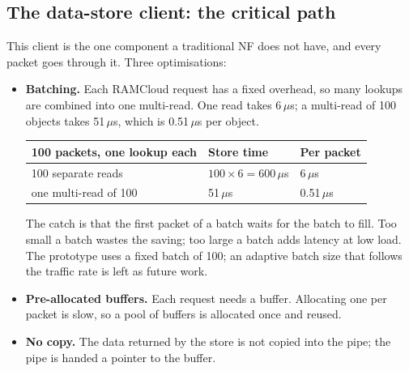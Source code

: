 \subsection{The data-store client: the critical path}\label{sec:slclient}
This client is the one component a traditional NF does not have, and every packet goes through it. Three optimisations:
\begin{itemize}
  \item \textbf{Batching.} Each RAMCloud request has a fixed overhead, so many lookups are combined into one multi-read. One read takes 6\,$\mu$s;
        a multi-read of 100 objects takes 51\,$\mu$s, which is 0.51\,$\mu$s per object.
        \begin{center}
        \begin{tabular}{@{}lll@{}}
        \toprule
        100 packets, one lookup each & Store time & Per packet\\
        \midrule
        100 separate reads & $100 \times 6 = 600\,\mu$s & 6\,$\mu$s\\
        one multi-read of 100 & 51\,$\mu$s & 0.51\,$\mu$s\\
        \bottomrule
        \end{tabular}
        \end{center}
        The catch is that the first packet of a batch waits for the batch to fill. Too small a batch wastes the saving; too large a batch adds latency
        at low load. The prototype uses a fixed batch of 100; an adaptive batch size that follows the traffic rate is left as future work.
  \item \textbf{Pre-allocated buffers.} Each request needs a buffer. Allocating one per packet is slow, so a pool of buffers is allocated once and reused.
  \item \textbf{No copy.} The data returned by the store is not copied into the pipe; the pipe is handed a pointer to the buffer.
\end{itemize}

